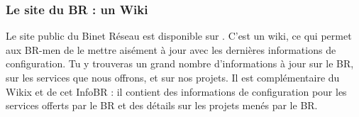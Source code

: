
\subsubsection{Le site du BR : un Wiki}
\label{siteBR}

Le site public du Binet Réseau est disponible sur . C'est un wiki, ce qui permet aux BR-men de le mettre aisément
à jour avec les dernières informations de configuration.
Tu y trouveras un grand nombre d'informations à jour sur le BR, sur les services que nous offrons, et sur nos projets.
Il est complémentaire du Wikix et de cet InfoBR : il contient des informations de configuration pour les services offerts par le
BR et des détails sur les projets menés par le BR.
